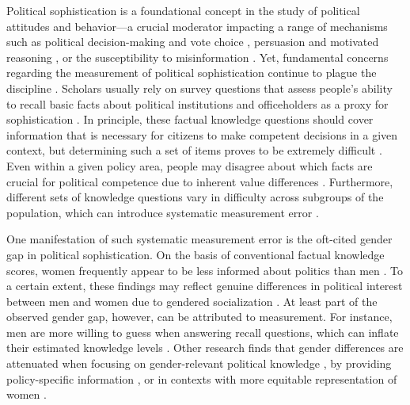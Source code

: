 

\newpage\setcounter{page}{1}

Political sophistication is a foundational concept in the study of political attitudes and behavior---a crucial moderator impacting a range of mechanisms such as political decision-making and vote choice \citep{macdonald1995political,lau2001advantages}, persuasion and motivated reasoning \citep{zaller1992nature,lodge2013rationalizing}, or the susceptibility to misinformation \citep{vegetti2020impact}. Yet, fundamental concerns regarding the measurement of political sophistication continue to plague the discipline \citep{mondak2001developing,sturgis2008experiment,bullock2021response}. Scholars usually rely on survey questions that assess people's ability to recall basic facts about political institutions and officeholders as a proxy for sophistication \citep{carpini1993measuring,barabas2014question}. In principle, these factual knowledge questions should cover information that is necessary for citizens to make competent decisions in a given context, but determining such a set of items proves to be extremely difficult \citep{lupia2006elitism}. Even within a given policy area, people may disagree about which facts are crucial for political competence due to inherent value differences \citep{lupia2015uninformed}. Furthermore, different sets of knowledge questions vary in difficulty across subgroups of the population, which can introduce systematic measurement error \citep{pietryka2013analysis}.

One manifestation of such systematic measurement error is the oft-cited gender gap in political sophistication. On the basis of conventional factual knowledge scores, women frequently appear to be less informed about politics than men \citep{verba1997knowing,wolak2011roots,fraile2014women}. To a certain extent, these findings may reflect genuine differences in political interest between men and women due to gendered socialization \citep{bos2021one}. At least part of the observed gender gap, however, can be attributed to measurement. For instance, men are more willing to guess when answering recall questions, which can inflate their estimated knowledge levels \citep{mondak2004knowledge,fortin2020political}. Other research finds that gender differences are attenuated when focusing on gender-relevant political knowledge \citep{dolan2011women}, by providing policy-specific information \citep{jerit2017revisiting}, or in contexts with more equitable representation of women \citep{pereira2019gendered,kraft2023glass}.

